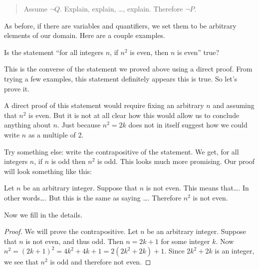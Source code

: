 \documentclass[12pt]{article}
\begin{document}
\begin{quote}
Assume $\neg Q$.  Explain, explain, \ldots, explain.  Therefore $\neg P$.
\end{quote}

As before, if there are variables and quantifiers, we set them to be arbitrary elements of our domain.  Here are a couple examples.

 \begin{example}
   Is the statement ``for all integers $n$, if $n^2$ is even, then $n$ is even'' true?
   \begin{solution}
     This is the converse of the statement we proved above using a direct proof.  From trying a few examples, this statement definitely appears this is true.  So let's prove it.

     A direct proof of this statement would require fixing an arbitrary $n$ and assuming that $n^2$ is even.  But it is not at all clear how this would allow us to conclude anything about $n$.  Just because $n^2 = 2k$ does not in itself suggest how we could write $n$ as a multiple of 2.

     Try something else: write the contrapositive of the statement.  We get, for all integers $n$, if $n$ is odd then $n^2$ is odd.  This looks much more promising.  Our proof will look something like this:

     Let $n$ be an arbitrary integer.  Suppose that $n$ is not even.  This means that\ldots.  In other words\ldots.  But this is the same as saying \ldots.  Therefore $n^2$ is not even.

     Now we fill in the details.
     \begin{proof}
       We will prove the contrapositive.  Let $n$ be an arbitrary integer.  Suppose that $n$ is not even, and thus odd.  Then $n= 2k+1$ for some integer $k$.  Now $n^2 = (2k+1)^2 = 4k^2 + 4k + 1 = 2(2k^2 + 2k) + 1$.  Since $2k^2 + 2k$ is an integer, we see that $n^2$ is odd and therefore not even.
     \end{proof}
   \end{solution}
 \end{example}
\end{document}
